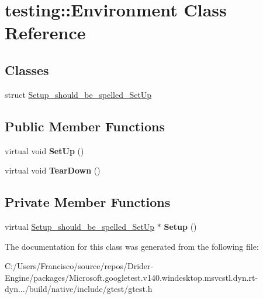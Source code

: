 \hypertarget{classtesting_1_1_environment}{}\section{testing\+:\+:Environment Class Reference}
\label{classtesting_1_1_environment}
\subsection*{Classes}
\begin{DoxyCompactItemize}
\item 
struct \hyperlink{structtesting_1_1_environment_1_1_setup__should__be__spelled___set_up}{Setup\+\_\+should\+\_\+be\+\_\+spelled\+\_\+\+Set\+Up}
\end{DoxyCompactItemize}
\subsection*{Public Member Functions}
\begin{DoxyCompactItemize}
\item 
\mbox{\label{classtesting_1_1_environment_a1bf8cafaa9d4eba9feb98655ee434eb3}} 
virtual void {\bfseries Set\+Up} ()
\item 
\mbox{\label{classtesting_1_1_environment_a039bdaa705c46b9b88234cf4d3bb6254}} 
virtual void {\bfseries Tear\+Down} ()
\end{DoxyCompactItemize}
\subsection*{Private Member Functions}
\begin{DoxyCompactItemize}
\item 
\mbox{\label{classtesting_1_1_environment_a6096a69b03f6eb727a69a39f854cc87b}} 
virtual \hyperlink{structtesting_1_1_environment_1_1_setup__should__be__spelled___set_up}{Setup\+\_\+should\+\_\+be\+\_\+spelled\+\_\+\+Set\+Up} $\ast$ {\bfseries Setup} ()
\end{DoxyCompactItemize}


The documentation for this class was generated from the following file\+:\begin{DoxyCompactItemize}
\item 
C\+:/\+Users/\+Francisco/source/repos/\+Drider-\/\+Engine/packages/\+Microsoft.\+googletest.\+v140.\+windesktop.\+msvcstl.\+dyn.\+rt-\/dyn.../build/native/include/gtest/gtest.\+h\end{DoxyCompactItemize}
